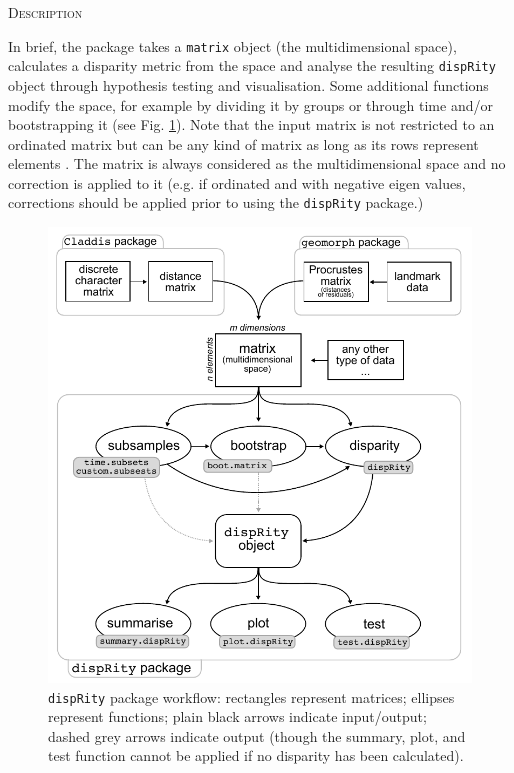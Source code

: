 \documentclass[12pt,letterpaper]{article}
\renewcommand{\section}[1]{%
\bigskip
\begin{center}
\begin{Large}
\normalfont\scshape #1
\medskip
\end{Large}
\end{center}}
\newcommand{\disp}{\texttt{dispRity} }
\begin{document}
\section{Description}
In brief, the package takes a \texttt{matrix} object (the multidimensional space), 
calculates a disparity metric from the space and analyse the resulting \texttt{dispRity} object through hypothesis testing and visualisation.
Some additional functions modify the space, for example by dividing it by groups or through time and/or bootstrapping it (see Fig. \ref{Fig:workflow}).
Note that the input matrix is not restricted to an ordinated matrix but can be any kind of matrix as long as its rows represent elements \citep[e.g. the space can be a distance matrix][]{Close2015}.
The matrix is always considered as the multidimensional space and no correction is applied to it (e.g. if ordinated and with negative eigen values, corrections should be applied prior to using the \texttt{dispRity} package.)

\begin{figure}[!htbp]
\centering
   \includegraphics[width=1\textwidth]{workflowsvg.pdf} 
\caption{\disp package workflow: rectangles represent matrices; ellipses represent functions; plain black arrows indicate input/output; dashed grey arrows indicate output (though the summary, plot, and test function cannot be applied if no disparity has been calculated).}
\label{Fig:workflow}
\end{figure}
\end{document}
